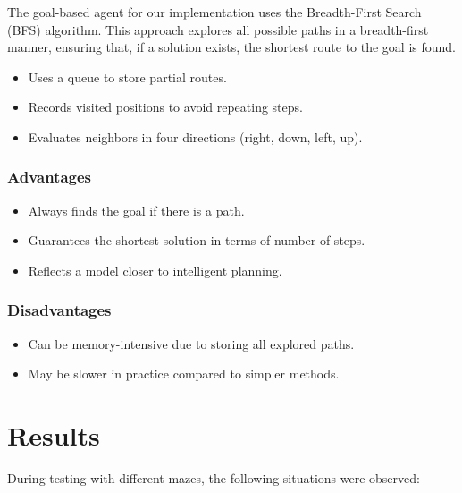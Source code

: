 \documentclass[letterpaper,12pt,oneside]{article}
\begin{document}
The goal-based agent for our implementation uses the Breadth-First Search (BFS) algorithm. This approach explores all possible paths in a breadth-first manner, ensuring that, if a solution exists, the shortest route to the goal is found.

\begin{itemize}
    \item Uses a queue to store partial routes.
    \item Records visited positions to avoid repeating steps.
    \item Evaluates neighbors in four directions (right, down, left, up).
\end{itemize}

\subsubsection{Advantages}

\begin{itemize}
    \item Always finds the goal if there is a path.
    \item Guarantees the shortest solution in terms of number of steps.
    \item Reflects a model closer to intelligent planning.
\end{itemize}
\subsubsection{Disadvantages}

\begin{itemize}
    \item Can be memory-intensive due to storing all explored paths.
    \item May be slower in practice compared to simpler methods.
\end{itemize}

\section{Results}

During testing with different mazes, the following situations were observed:
\end{document}
